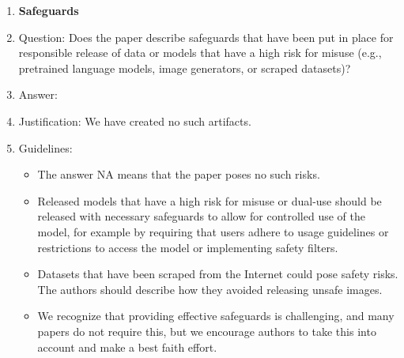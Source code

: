 \documentclass{article}
\begin{document}
\begin{enumerate}
\item {\bf Safeguards}
    \item[] Question: Does the paper describe safeguards that have been put in place for responsible release of data or models that have a high risk for misuse (e.g., pretrained language models, image generators, or scraped datasets)?
    \item[] Answer: \answerNA{} %
    \item[] Justification: We have created no such artifacts.
    \item[] Guidelines:
    \begin{itemize}
        \item The answer NA means that the paper poses no such risks.
        \item Released models that have a high risk for misuse or dual-use should be released with necessary safeguards to allow for controlled use of the model, for example by requiring that users adhere to usage guidelines or restrictions to access the model or implementing safety filters. 
        \item Datasets that have been scraped from the Internet could pose safety risks. The authors should describe how they avoided releasing unsafe images.
        \item We recognize that providing effective safeguards is challenging, and many papers do not require this, but we encourage authors to take this into account and make a best faith effort.
    \end{itemize}


\end{enumerate}
\end{document}
